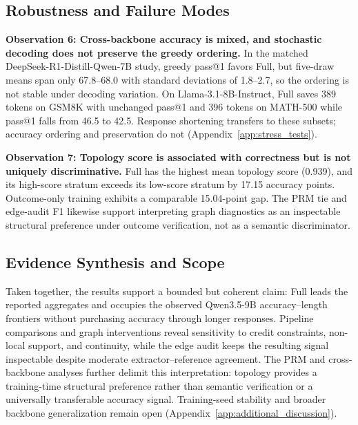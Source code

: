 \subsection{Robustness and Failure Modes}
\label{sec:robustness}

\noindent\textbf{Observation 6: Cross-backbone accuracy is mixed, and stochastic decoding does not preserve the greedy ordering.}
In the matched DeepSeek-R1-Distill-Qwen-7B study, greedy pass@1 favors Full, but five-draw means span only 67.8--68.0 with standard deviations of 1.8--2.7, so the ordering is not stable under decoding variation. On Llama-3.1-8B-Instruct, Full saves 389 tokens on GSM8K with unchanged pass@1 and 396 tokens on MATH-500 while pass@1 falls from 46.5 to 42.5. Response shortening transfers to these subsets; accuracy ordering and preservation do not (Appendix~\ref{app:stress_tests}).

\noindent\textbf{Observation 7: Topology score is associated with correctness but is not uniquely discriminative.}
Full has the highest mean topology score (0.939), and its high-score stratum exceeds its low-score stratum by 17.15 accuracy points. Outcome-only training exhibits a comparable 15.04-point gap. The PRM tie and edge-audit F1 likewise support interpreting graph diagnostics as an inspectable structural preference under outcome verification, not as a semantic discriminator.

\subsection{Evidence Synthesis and Scope}
\label{sec:evidence_scope}

Taken together, the results support a bounded but coherent claim: Full leads the reported aggregates and occupies the observed Qwen3.5-9B accuracy--length frontiers without purchasing accuracy through longer responses. Pipeline comparisons and graph interventions reveal sensitivity to credit constraints, non-local support, and continuity, while the edge audit keeps the resulting signal inspectable despite moderate extractor--reference agreement. The PRM and cross-backbone analyses further delimit this interpretation: topology provides a training-time structural preference rather than semantic verification or a universally transferable accuracy signal. Training-seed stability and broader backbone generalization remain open (Appendix~\ref{app:additional_discussion}).
